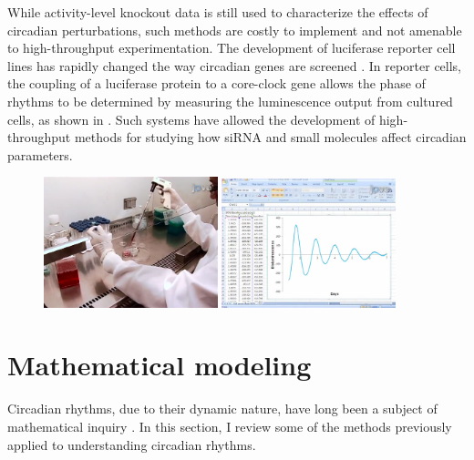 While activity-level knockout data is still used to characterize the effects of circadian perturbations, such methods are costly to implement and not amenable to high-throughput experimentation.
The development of luciferase reporter cell lines has rapidly changed the way circadian genes are screened \cite{Yoo2004}.
In reporter cells, the coupling of a luciferase protein to a core-clock gene allows the phase of rhythms to be determined by measuring the luminescence output from cultured cells, as shown in .
Such systems have allowed the development of high-throughput methods for studying how siRNA \cite{Zhang2009} and small molecules \cite{Hirota2008} affect circadian parameters.

\begin{figure}[tbp]
  \centering
  \includegraphics[width=0.45\textwidth]{chap1/figures/cells.png}
  \includegraphics[width=0.45\textwidth]{chap1/figures/data.png}
  \label{fig:chidalumin}
\end{figure}

\section{Mathematical modeling}

Circadian rhythms, due to their dynamic nature, have long been a subject of mathematical inquiry \cite{Winfree2001}. In this section, I review some of the methods previously applied to understanding circadian rhythms.

